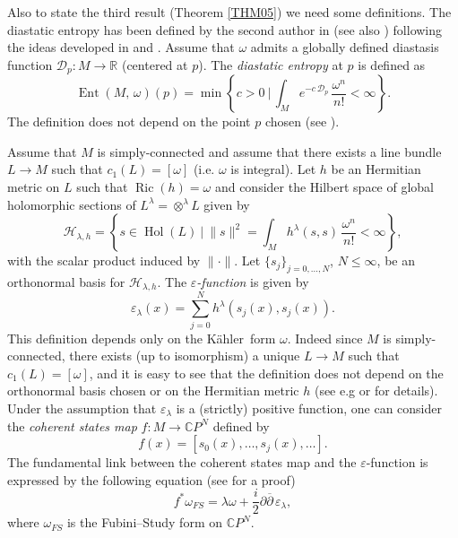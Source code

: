 \documentclass[reqno]{amsart}
\begin{document}
Also to state   the third result (Theorem \ref{THM05}) we need some definitions.
The diastatic entropy has been defined by the second author in \cite{M04} (see also \cite{mossa1}) following the ideas developed in \cite{LM01} and \cite{mossa2}.
Assume that $\omega$ admits a globally defined  diastasis function  ${\mathcal{D}}_p:M {\rightarrow} {\mathbb{R}}$ (centered at $p$). The \emph{diastatic entropy} at $p$ is defined as
\begin{equation}\label{def dent}
{\operatorname{Ent}}\left( M, \, \omega \right)\left( p\right)= \min \left\{ c >0 \ | \, \int_M e^{-c \, {\mathcal{D}}_p }\, \frac{\omega^n}{n!}<\infty \right\} .
\end{equation}
The definition does not depend on the point $p$ chosen  (see \cite[Proposition 2.2]{mossa1}).

Assume that $M$ is simply-connected and assume that there exists a line bundle $L {\rightarrow} M$ such that $c_1(L)=[\omega]$ (i.e. $\omega$ is integral). Let $h$ be an Hermitian metric on $L$ such that ${\operatorname{Ric}}(h)=\omega$ and consider the Hilbert space of global holomorphic sections of $L^{\lambda}=\otimes^{\lambda} L$ given by
\begin{equation}\label{hilbertspaceh}
{\mathcal{H}}_{{\lambda},h}=\left\{ s\in{\operatorname{Hol}}(L) \ |\   \|  s \|^2 = \int_M  h^{\lambda}(s,s)\, \frac{\omega^n}{n!}<\infty\right\},
\end{equation}
with the scalar product induced by $\| \cdot \|$.
Let $\{s_j\}_{j=0,\dots,N}$, $N \leq \infty$, be an orthonormal basis for ${\mathcal{H}}_{{\lambda}, h}$. The \emph{$\varepsilon$-function} is given by
\begin{equation}\label{epl}
\varepsilon_{\lambda}(x)=\sum_{j=0}^Nh^{\lambda}(s_j(x),s_j(x)).
\end{equation}
This definition depends only on the {K\"{a}hler}\ form $\omega$. Indeed since $M$ is simply-connected, there exists (up to isomorphism) a unique $L {\rightarrow} M$ such that $c_1(L)=[\omega]$, and 
 it is easy to see that the definition  does not depend on the orthonormal basis chosen or on the Hermitian metric $h$ (see e.g \cite{LM03} or \cite{M01,LM02} for details). 
Under the assumption that $\varepsilon_{\lambda}$ is a (strictly) positive function, one can  consider the  \emph{coherent states map} $f: M {\rightarrow} {\mathbb{C}} P^N$ defined by
\begin{equation}\label{eqcoherent}
f(x)=\left[s_0(x), \dots, s_j(x), \dots\right].
\end{equation}
The fundamental  link between the coherent states map and the $\varepsilon$-function
is expressed by the following equation (see \cite{rawnsley} for a proof)
\begin{equation}\label{pullbackdie}
f^*\omega_{FS}={\lambda} \omega + \frac{i}{2} {\partial} {{\overline{\partial}}}\, \varepsilon_{\lambda} ,
\end{equation}
where $\omega_{FS}$ is the Fubini--Study form on ${\mathbb{C}} P^N$.
 
\end{document}
